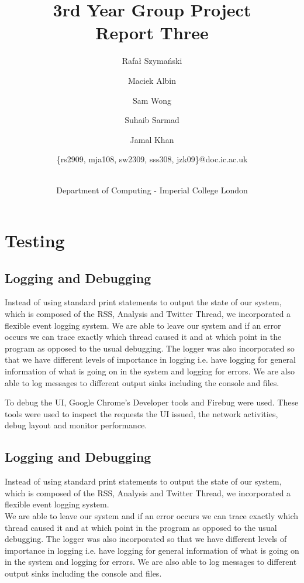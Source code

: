 \documentclass[a4paper,12pt]{article}
\title{3rd Year Group Project\\Report Three\\}
\author{
    \small{Rafał Szymański}\\
  	\and
    \small{Maciek Albin}\\
    \and
    \small{Sam Wong}\\
    \and  
    \small{Suhaib Sarmad}\\
		\and
		\small{Jamal Khan}\\
		\and
		\small{\{rs2909, mja108, sw2309, sss308, jzk09\}@doc.ic.ac.uk}
		\and
		\\Department of Computing - Imperial College London
}
\date{}
\begin{document}
 
	\maketitle
	
	\section{Testing}
		\subsection{Logging and Debugging}

		  Instead of using standard print statements to output the state of our system, which is composed of the RSS, Analysis and Twitter Thread, we incorporated a flexible event logging system.
		We are able to leave our system and if an error occurs we can trace exactly which thread caused it and at which point in the program as opposed to the usual debugging.
	  The logger was also incorporated so that we have different levels of importance in logging i.e. have logging for general information of what is going on in the system and logging for errors. We are also able to log messages to different output sinks including the console and files.

		To debug the UI, Google Chrome’s Developer tools and Firebug were used. These tools were used to inspect the requests the UI issued, the network activities, debug layout and monitor performance.

	
	
	  \subsection{Logging and Debugging}
	
	  Instead of using standard print statements to output the state of our system, which is composed of the RSS, Analysis and Twitter Thread, we incorporated a flexible event logging system.\\
	We are able to leave our system and if an error occurs we can trace exactly which thread caused it and at which point in the program as opposed to the usual debugging.
  The logger was also incorporated so that we have different levels of importance in logging i.e. have logging for general information of what is going on in the system and logging for errors. We are also able to log messages to different output sinks including the console and files.
	
\end{document}

